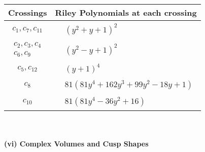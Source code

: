 \documentclass[1p]{elsarticle_modified}
\theoremstyle{definition}
\begin{document}
\begin{tabular}{m{50pt}|m{274pt}}
Crossings & \hspace{64pt}Riley Polynomials at each crossing \\
\hline $$\begin{aligned}c_{1},c_{7},c_{11}\end{aligned}$$&$\begin{aligned}
&(y^2+y+1)^2
\end{aligned}$\\
\hline $$\begin{aligned}c_{2},c_{3},c_{4}\\c_{6},c_{9}\end{aligned}$$&$\begin{aligned}
&(y^2- y+1)^2
\end{aligned}$\\
\hline $$\begin{aligned}c_{5},c_{12}\end{aligned}$$&$\begin{aligned}
&(y+1)^4
\end{aligned}$\\
\hline $$\begin{aligned}c_{8}\end{aligned}$$&$\begin{aligned}
&81(81 y^4+162 y^3+99 y^2-18 y+1)
\end{aligned}$\\
\hline $$\begin{aligned}c_{10}\end{aligned}$$&$\begin{aligned}
&81(81 y^4-36 y^2+16)
\end{aligned}$\\
\hline
\end{tabular}\\~\\
\newpage\flushleft \textbf{(vi) Complex Volumes and Cusp Shapes}
\end{document}
